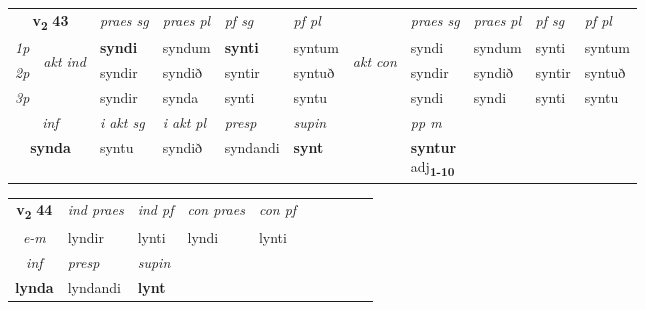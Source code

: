 \noindent
\begin{tabular}{lllllllllll} \toprule
\multicolumn{2}{c}{\textbf{v{\textsubscript{2}}} \Large{\textbf{43}}}  &  \textit{praes sg}  & \textit{praes pl}  &\textit{ pf sg} & \textit{pf pl} &  &  \textit{praes sg}  & \textit{praes pl}  & \textit{pf sg} & \textit{pf pl } \\*
	\cmidrule{3-6} \cmidrule{8-11}
 {\textit{1p}} & \multirow{3}{*}{\begin{turn}{90}\textit{akt ind}\end{turn}} & \textbf{syndi} & syndum & \textbf{synti} & syntum & \multirow{3}{*}{\begin{turn}{90}\textit{akt con}\end{turn}} &syndi & syndum & synti & syntum\\*
 {\textit{2p}} &  &  syndir  & syndið & syntir & syntuð & & syndir & syndið & syntir & syntuð \\*
{\textit{3p}} &  & syndir & synda & synti & syntu & & syndi & syndi& synti & syntu \\*
\cmidrule{3-6} \cmidrule{8-11}

   \multicolumn{2}{c}{\textit{inf}}  & \textit{i akt sg} & \textit{i akt pl}   & \textit{presp} & \textit{supin}  && \textit{pp m} \\*
  \multicolumn{2}{c}{\textbf{synda}} & syntu  & syndið   & syndandi &  \textbf{synt}  && \specialcell{\textbf{syntur} \\ adj\textbf{\textsubscript{1-10}}} \\*
\end{tabular}

\noindent
\begin{tabular}{lllllllllll} \toprule
\multicolumn{2}{c}{\textbf{v{\textsubscript{2}}} \Large{\textbf{44}}}  &  \textit{ind praes} & \textit{ind pf} & \textit{con praes} & \textit{con pf} \\*
\multicolumn{2}{c}{ \textit{e-m} } & lyndir & lynti & lyndi & lynti \\*

\cmidrule{3-4}
   \multicolumn{2}{c}{\textit{inf}}     & \textit{presp} & \textit{supin}   \\*
  \multicolumn{2}{c}{\textbf{lynda}}      & lyndandi &  \textbf{lynt}   \\*
\end{tabular}

